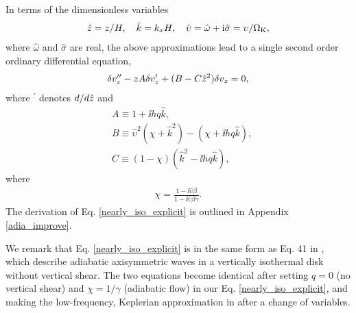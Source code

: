  In terms of the dimensionless variables
\begin{align}
  \hat{z} = z/H,\quad \hat{k}=k_xH, \quad \hat{\upsilon} =\hat{\omega} +
  \mathrm{i}\hat{\sigma}= \upsilon/\Omega_{\rm K},
\end{align}
where $\hat{\omega}$ and $\hat{\sigma}$ are real, the above
approximations lead to a single second order ordinary differential
equation, 
\begin{align}
  \delta v_z^{\prime\prime} - z A\delta v_z^\prime +
  (B - C\hat{z}^2)\delta v_z = 0,\label{nearly_iso_explicit}
\end{align}
where $^\prime$ denotes $d/d\hat{z}$ and 
\begin{align}
  &A \equiv 1 + \ii h q \hat{k},\\
  &B \equiv \hat{\upsilon}^2\left(\chi + \hat{k}^2\right) -
  \left(\chi + \ii h q \hat{k}\right),\\
  &C \equiv \left(1-\chi\right)\left(\hat{k}^2 - \ii
    h q\hat{k}\right), 
\end{align}
where
\begin{align}
\chi = \frac{1-\ii\hat{\upsilon}\beta}{1-\ii\hat{\upsilon}\beta\gamma}.
\end{align}
The derivation of Eq. \ref{nearly_iso_explicit}  is outlined in
Appendix \ref{adia_improve}. 
 
We remark that Eq. \ref{nearly_iso_explicit} is in the same 
form as Eq. 41 in \cite{lubow93}, which describe adiabatic axisymmetric waves in
a vertically isothermal disk without vertical shear. The two equations
become identical after  setting $q=0$ (no vertical shear) and
$\chi=1/\gamma$ (adiabatic flow) in our Eq. \ref{nearly_iso_explicit},
and making the low-frequency, Keplerian approximation in
\citeauthor{lubow93} after a change of variables.    

